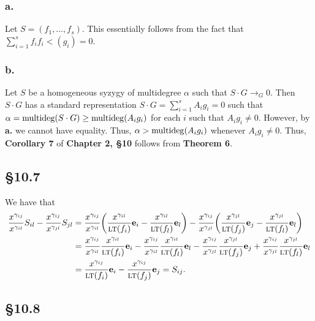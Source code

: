 \documentclass[letterpaper]{article}
\begin{document}
\subsubsection*{a.}

Let $S = (f_{1}, \ldots, f_{s})$.
This essentially follows from the fact that $\sum_{i = 1}^{s} f_{i} f_{i} \lt(g_{i}) = 0$.

\subsubsection*{b.}

Let $S$ be a homogeneous syzygy of multidegree $\alpha$ such that $S \cdot G \to_{G} 0$.
Then $S \cdot G$ has a standard representation $S \cdot G = \sum_{i = 1}^{s} A_{i} g_{i} = 0$ such that $\alpha = \operatorname{multideg}(S \cdot G) \geq \operatorname{multideg}(A_{i} g_{i})$ for each $i$ such that $A_{i} g_{i} \neq 0$.
However, by \textbf{a.} we cannot have equality.
Thus, $\alpha > \operatorname{multideg}(A_{i} g_{i})$ whenever $A_{i} g_{i} \neq 0$.
Thus, \textbf{Corollary 7} of \textbf{Chapter 2, \S 10} follows from \textbf{Theorem 6}.

\subsection*{\S 10.7}

We have that
\begin{align*}
  \frac{x^{\gamma_{ij}}}{x^{\gamma_{il}}} S_{il} - \frac{x^{\gamma_{ij}}}{x^{\gamma_{jl}}} S_{jl} &= \frac{x^{\gamma_{ij}}}{x^{\gamma_{il}}} \pqty{\frac{x^{\gamma_{il}}}{\lt(f_{i})}\mathbf{e}_{i} -\frac{x^{\gamma_{il}}}{\lt(f_{l})} \mathbf{e}_{l} } - \frac{x^{\gamma_{ij}}}{x^{\gamma_{jl}}} \pqty{\frac{x^{\gamma_{jl}}}{\lt(f_{j})}\mathbf{e}_{j} -\frac{x^{\gamma_{jl}}}{\lt(f_{l})} \mathbf{e}_{l} } \\
  &= \frac{x^{\gamma_{ij}}}{x^{\gamma_{il}}} \frac{x^{\gamma_{il}}}{\lt(f_{i})}\mathbf{e}_{i} - \frac{x^{\gamma_{ij}}}{x^{\gamma_{il}}}\frac{x^{\gamma_{il}}}{\lt(f_{l})} \mathbf{e}_{l} - \frac{x^{\gamma_{ij}}}{x^{\gamma_{jl}}} \frac{x^{\gamma_{jl}}}{\lt(f_{j})}\mathbf{e}_{j} + \frac{x^{\gamma_{ij}}}{x^{\gamma_{jl}}} \frac{x^{\gamma_{jl}}}{\lt(f_{l})} \mathbf{e}_{l} \\
  &= \frac{x^{\gamma_{ij}}}{\lt(f_{i})}\mathbf{e}_{i} -\frac{x^{\gamma_{ij}}}{\lt(f_{j})} \mathbf{e}_{j} = S_{ij}.
\end{align*}

\subsection*{\S 10.8}
\end{document}
